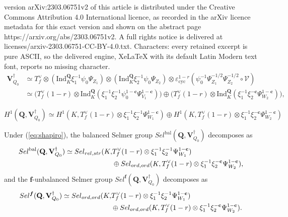 \documentclass[10pt,a4paper]{amsart}
\DeclareMathOperator{\bal}{\mathrm{bal}}
\newcommand{\Q}{\mathbf{Q}}
\newcommand{\Sel}{Sel}
\newcommand{\Vsdag}{{\mathbf{V}_{Q_0}^\dagger}}
\newcommand{\cc}{\mathbf{c}}
\newcommand{\ch}{\xi}
\newcommand{\ord}{{{\rm ord},{\rm ord}}}
\newcommand{\rH}{H}
\newcommand{\relstr}{{{\rm rel},{\rm str}}}
\newcommand{\unb}{{\boldsymbol{f}}}
\begin{document}
version arXiv:2303.06751v2 of this article is distributed under the Creative Commons Attribution 4.0 International licence, as recorded in the arXiv licence metadata for this exact version and shown on the abstract page https://arxiv.org/abs/2303.06751v2. A full rights notice is delivered at licenses/arxiv-2303.06751-CC-BY-4.0.txt. Characters: every retained excerpt is pure ASCII, so the delivered engine, XeLaTeX with its default Latin Modern text font, reports no missing character.
\begin{equation}\label{eq:dec-V-first}
\begin{aligned}
\Vsdag&\simeq T_f^{\vee}\otimes({\mathrm{Ind}}_K^\Q\ch_1^{-1}\psi_0\Psi_{Z_1})\otimes({\mathrm{Ind}}_K^\Q\ch_2^{-1}\psi_0\Psi_{Z_2})\otimes\varepsilon_{\mathrm{cyc}}^{1-r}(\psi_0^{-1}\Psi_{Z_1}^{-1/2}\Psi_{Z_2}^{-1/2}\circ\mathscr{V})\\
&\simeq\bigl(T_f^{\vee}(1-r)\otimes{\mathrm{Ind}}_{K}^\Q(\ch_1^{-1}\ch_2^{-1}\psi_0^{1-\cc}\Psi_{V_1}^{1-\cc})\bigr)\oplus\bigl(T_f^{\vee}(1-r)\otimes{\mathrm{Ind}}_K^\Q(\ch_1^{-1}\ch_2^{-\cc}\Psi_{W_2}^{1-\cc})\bigr),
\end{aligned}
\end{equation}

\begin{equation}\label{eq:shapiro}
\rH^1(\Q,\Vsdag)\simeq\rH^1(K,T_f^{\vee}(1-r)\otimes\ch_1^{-1}\ch_2^{-1}\Psi_{W_1}^{1-\cc})\oplus\rH^1(K,T_f^{\vee}(1-r)\otimes\ch_1^{-1}\ch_2^{-\cc}\Psi_{W_2}^{1-\cc})
\end{equation}

\begin{prop}\label{prop:factor-S}
Under (\ref{eq:shapiro}), the balanced Selmer group $\Sel^{\bal}(\Q,\Vsdag)$ decomposes as
\begin{align*}
\Sel^{\bal}(\Q,\Vsdag)\simeq\Sel_{\relstr}(K,&T_f^{\vee}(1-r)\otimes\ch_1^{-1}\ch_2^{-1}\Psi_{W_1}^{1-\cc})\\ &\oplus\Sel_{\ord}(K,T_f^{\vee}(1-r)\otimes\ch_1^{-1}\ch_2^{-\cc}\Psi_{W_2}^{1-\cc}),
\end{align*}
and the $\unb$-unbalanced Selmer group $\Sel^{\unb}(\Q,\Vsdag)$ decomposes as
\begin{align*}
\Sel^{\unb}(\Q,\Vsdag)\simeq
\Sel_{\ord}(K,&T_f^{\vee}(1-r)\otimes\ch_1^{-1}\ch_2^{-1}\Psi_{W_1}^{1-\cc})\\ &\oplus\Sel_{\ord}(K,T_f^{\vee}(1-r)\otimes\ch_1^{-1}\ch_2^{-\cc}\Psi_{W_2}^{1-\cc}).\end{align*}
\end{prop}
\end{document}
